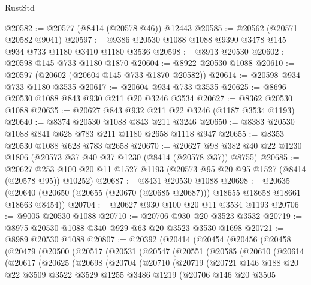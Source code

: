 \begin{lexlean}{RustStd}
\begin{coremodule}
@20582 := @20577 (@8414 (@20578 @46)) @12443
@20585 := @20562 (@20571 @20582 @9041)
@20597 := @9386 @20530 @1088 @1088 @9390 @3478 @145 @934 @733 @1180 @3410 @1180 @3536
@20598 := @8913 @20530
@20602 := @20598 @145 @733 @1180 @1870
@20604 := @8922 @20530 @1088
@20610 := @20597 (@20602 (@20604 @145 @733 @1870 @20582))
@20614 := @20598 @934 @733 @1180 @3535
@20617 := @20604 @934 @733 @3535
@20625 := @8696 @20530 @1088 @843 @930 @211 @20 @3246 @3534
@20627 := @8362 @20530 @1088
@20635 := @20627 @843 @932 @211 @22 @3246 (@1187 @3534 @1193)
@20640 := @8374 @20530 @1088 @843 @211 @3246
@20650 := @8383 @20530 @1088 @841 @628 @783 @211 @1180 @2658 @1118 @947
@20655 := @8353 @20530 @1088 @628 @783 @2658
@20670 := @20627 @98 @382 @40 @22 @1230 @1806 (@20573 @37 @40 @37 @1230 (@8414 (@20578 @37)) @8755)
@20685 := @20627
    @253
    @100
    @20
    @11
    @1527
    @1193
    (@20573 @95 @20 @95 @1527 (@8414 (@20578 @95)) @10252)
@20687 := @8431 @20530 @1088
@20698 := @20635
    (@20640 (@20650 (@20655 (@20670 (@20685 @20687))) @18655 @18658 @18661 @18663 @8454))
@20704 := @20627 @930 @100 @20 @11 @3534 @1193
@20706 := @9005 @20530 @1088
@20710 := @20706 @930 @20 @3523 @3532
@20719 := @8975 @20530 @1088 @340 @929 @63 @20 @3523 @3530 @1698
@20721 := @8989 @20530 @1088
@20807 := @20392
    (@20414
      (@20454
        (@20456
          (@20458
            (@20479
              (@20500
                (@20517
                  (@20531
                    (@20547
                      (@20551
                        (@20585
                          (@20610
                            (@20614
                              (@20617
                                (@20625
                                  (@20698
                                    (@20704
                                      (@20710
                                        (@20719
                                          (@20721
                                            @146
                                            @188
                                            @20
                                            @22
                                            @3509
                                            @3522
                                            @3529
                                            @1255
                                            @3486
                                            @1219
                                            (@20706
                                              @146
                                              @20
                                              @3505

\end{coremodule}
\end{lexlean}
